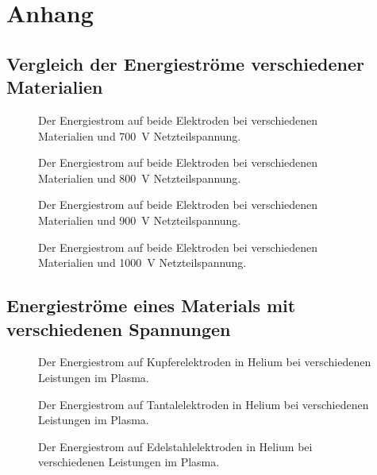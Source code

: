 \chapter{Anhang}

\section{Vergleich der Energieströme verschiedener Materialien}

\begin{figure}[H]
	\centering
	
	\caption{Der Energiestrom auf beide Elektroden bei verschiedenen Materialien und \qty{700}{V} Netzteilspannung.}
	\label{fig:energiestrom}
\end{figure}
\begin{figure}[H]
	\centering
	
	\caption{Der Energiestrom auf beide Elektroden bei verschiedenen Materialien und \qty{800}{V} Netzteilspannung.}
	\label{fig:energiestrom}
\end{figure}
\begin{figure}[H]
	\centering
	
	\caption{Der Energiestrom auf beide Elektroden bei verschiedenen Materialien und \qty{900}{V} Netzteilspannung.}
	\label{fig:energiestrom}
\end{figure}
\begin{figure}[H]
	\centering
	
	\caption{Der Energiestrom auf beide Elektroden bei verschiedenen Materialien und \qty{1000}{V} Netzteilspannung.}
	\label{fig:energiestrom}
\end{figure}

\section{Energieströme eines Materials mit verschiedenen Spannungen}

\begin{figure}[H]
	\centering
	
	\caption{Der Energiestrom auf Kupferelektroden in Helium bei verschiedenen Leistungen im Plasma.}
	\label{fig:einzelleistungen}
\end{figure}
\begin{figure}[H]
	\centering
	
	\caption{Der Energiestrom auf Tantalelektroden in Helium bei verschiedenen Leistungen im Plasma.}
	\label{fig:einzelleistungen}
\end{figure}
\begin{figure}[H]
	\centering
	
	\caption{Der Energiestrom auf Edelstahlelektroden in Helium bei verschiedenen Leistungen im Plasma.}
	\label{fig:einzelleistungen}
\end{figure}
